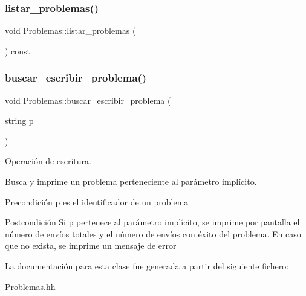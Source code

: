 \mbox{\label{class_problemas_a8c3ec08e7f02cc4ce8c2b5e9a3e19f4c}} 
\subsubsection{\texorpdfstring{listar\+\_\+problemas()}{listar\_problemas()}}
{\footnotesize\ttfamily void Problemas\+::listar\+\_\+problemas (\begin{DoxyParamCaption}{ }\end{DoxyParamCaption}) const}

\mbox{\label{class_problemas_a36f5cb6d84345475fd7ea80142d7500d}} 
\subsubsection{\texorpdfstring{buscar\+\_\+escribir\+\_\+problema()}{buscar\_escribir\_problema()}}
{\footnotesize\ttfamily void Problemas\+::buscar\+\_\+escribir\+\_\+problema (\begin{DoxyParamCaption}\item[{string}]{p }\end{DoxyParamCaption})}



Operación de escritura. 

Busca y imprime un problema perteneciente al parámetro implícito. \begin{DoxyPrecond}{Precondición}
p es el identificador de un problema 
\end{DoxyPrecond}
\begin{DoxyPostcond}{Postcondición}
Si p pertenece al parámetro implícito, se imprime por pantalla el número de envíos totales y el número de envíos con éxito del problema. En caso que no exista, se imprime un mensaje de error 
\end{DoxyPostcond}


La documentación para esta clase fue generada a partir del siguiente fichero\+:\begin{DoxyCompactItemize}
\item 
\mbox{\hyperlink{_problemas_8hh}{Problemas.\+hh}}\end{DoxyCompactItemize}
